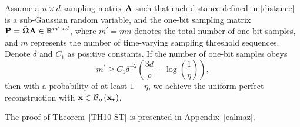 \documentclass[12pt,draftcls,onecolumn]{IEEEtran}
\begin{document}
\begin{theorem}
\label{TH10-ST}
Assume a $n\times d$ sampling matrix $\mathbf{A}$ such that each distance defined in \eqref{distance} is a
sub-Gaussian random variable,
and the one-bit sampling matrix $\mathbf{P}=\Tilde{\boldsymbol{\Omega}}\mathbf{A} \in \mathbb{R}^{m^{\prime}\times d}$, where $m^{\prime}=mn$ denotes the total number of one-bit samples, and $m$ represents the number of time-varying sampling threshold sequences. %
Denote $\delta$ and $C_1$ as positive constants. 
If the number of one-bit samples obeys
\begin{equation}
\label{goodarz}
m^{\prime}\geq C_1\delta^{-2}\left(\frac{3d}{\rho}+\log\left(\frac{1}{\eta}\right)\right), 
\end{equation}
then with a probability of at least $1-\eta$, we achieve the uniform perfect reconstruction with $\bar{\mathbf{x}}\in\mathcal{B}_\rho\left(\mathbf{x}_{\star}\right)$.

\end{theorem}
The proof of Theorem~\ref{TH10-ST} is presented in Appendix~\ref{ealmaz}.
\end{document}
